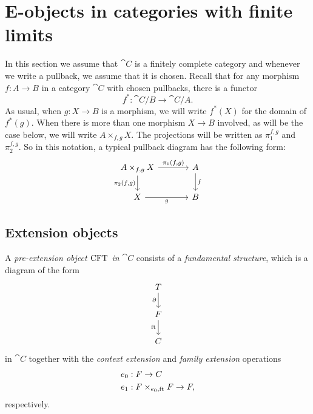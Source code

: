 \section{E-objects in categories with finite limits}
In this section we assume that $\cat{C}$ is a finitely complete category and
whenever we write a pullback, we assume that it is chosen. Recall that for
any morphism $f:A\to B$ in a category $\cat{C}$ with chosen pullbacks, there
is a functor
\begin{equation*}
f^\ast : \cat{C}/B\to\cat{C}/A.
\end{equation*}
As usual, when $g:X\to B$ is a morphism, we will write $f^\ast(X)$ for the
domain of $f^\ast(g)$. When there is more than one morphism $X\to B$ involved,
as will be the case below, we will write $A\times_{f,g}X$. The projections
will be written as $\pi_1^{f,g}$ and $\pi_2^{f,g}$. So in this notation, a
typical pullback diagram has the following form:
\begin{equation*}
\begin{tikzcd}[column sep=large]
\pullback{A}{X}{f}{g}
  \ar{r}{\pullbackpr{1}{f}{g}}
  \ar{d}[swap]{\pullbackpr{2}{f}{g}}
  &
A \ar{d}{f}
  \\
X \ar{r}[swap]{g}
  &
B
\end{tikzcd}
\end{equation*}

\subsection{Extension objects}
\begin{defn}
A \emph{pre-extension object $\mathrm{CFT}$ in $\cat{C}$} consists of a \emph{fundamental structure}, which is a diagram of the form
\begin{equation*}
\begin{tikzcd}
\stesyst
  \ar{d}[swap]{\ebd}
  \\
\stesysf
  \ar{d}[swap]{\eft}
  \\
\stesysc
\end{tikzcd}
\end{equation*}
in $\cat{C}$ together with the \emph{context extension} and \emph{family extension} operations
\begin{align*}
\ectxext &:\stesysf\to \stesysc\\
\efamext & :\stesysff\to \stesysf,
\end{align*}
respectively.
\end{defn}

